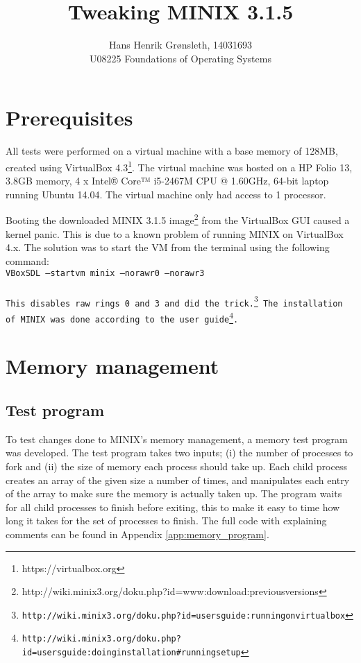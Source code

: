 \documentclass[11pt]{article}
\title{\textbf{Tweaking MINIX 3.1.5}}
\author{Hans Henrik Grønsleth, 14031693\\
		U08225 Foundations of Operating Systems}
\begin{document}
\maketitle
\tableofcontents

\clearpage
\section{Prerequisites}
All tests were performed on a virtual machine with a base memory of 128MB, created using VirtualBox 4.3\footnote{https://virtualbox.org}. The virtual machine was hosted on a HP Folio 13, 3.8GB memory, 4 x Intel® Core™ i5-2467M CPU @ 1.60GHz, 64-bit laptop running Ubuntu 14.04. The virtual machine only had access to 1 processor.

Booting the downloaded MINIX 3.1.5 image\footnote{http://wiki.minix3.org/doku.php?id=www:download:previousversions} from the VirtualBox GUI caused a kernel panic. This is due to a known problem of running MINIX on VirtualBox 4.x. The solution was to start the VM from the terminal using the following command:\\

\tt VBoxSDL --startvm minix --norawr0 --norawr3\normalfont\\\\
This disables raw rings 0 and 3 and did the trick.\footnote{http://wiki.minix3.org/doku.php?id=usersguide:runningonvirtualbox} The installation of MINIX was done according to the user guide\footnote{http://wiki.minix3.org/doku.php?id=usersguide:doinginstallation\#runningsetup}.

\section{Memory management}
\subsection{Test program}
To test changes done to MINIX's memory management, a memory test program was developed. The test program takes two inputs; (i) the number of processes to fork and (ii) the size of memory each process should take up. Each child process creates an array of the given size a number of times, and manipulates each entry of the array to make sure the memory is actually taken up. The program waits for all child processes to finish before exiting, this to make it easy to time how long it takes for the set of processes to finish. The full code with explaining comments can be found in Appendix \ref{app:memory_program}.
\end{document}
